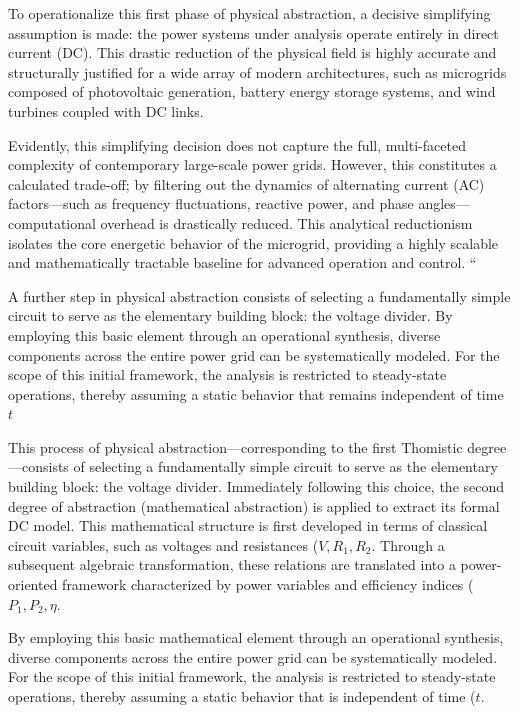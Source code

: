 \documentclass[energies,accept,oneauthor,pdftex]{Definitions/mdpi}
\begin{document}
To operationalize this first phase of physical abstraction, a decisive simplifying assumption is made: the power systems under analysis operate entirely in direct current (DC). This drastic reduction of the physical field is highly accurate and structurally justified for a wide array of modern architectures, such as microgrids composed of photovoltaic generation, battery energy storage systems, and wind turbines coupled with DC links.

Evidently, this simplifying decision does not capture the full, multi-faceted complexity of contemporary large-scale power grids. However, this constitutes a calculated trade-off; by filtering out the dynamics of alternating current (AC) factors—such as frequency fluctuations, reactive power, and phase angles—computational overhead is drastically reduced. This analytical reductionism isolates the core energetic behavior of the microgrid, providing a highly scalable and mathematically tractable baseline for advanced operation and control. ``

A further step in physical abstraction consists of selecting a fundamentally simple circuit to serve as the elementary building block: the voltage divider. By employing this basic element through an operational synthesis, diverse components across the entire power grid can be systematically modeled. For the scope of this initial framework, the analysis is restricted to steady-state operations, thereby assuming a static behavior that remains independent of time \(t\)


This process of physical abstraction—corresponding to the first Thomistic degree—consists of selecting a fundamentally simple circuit to serve as the elementary building block: the voltage divider. Immediately following this choice, the second degree of abstraction (mathematical abstraction) is applied to extract its formal DC model. This mathematical structure is first developed in terms of classical circuit variables, such as voltages and resistances (\(V, R_1, R_2\). Through a subsequent algebraic transformation, these relations are translated into a power-oriented framework characterized by power variables and efficiency indices (\(P_1, P_2, \eta\).


By employing this basic mathematical element through an operational synthesis, diverse components across the entire power grid can be systematically modeled. For the scope of this initial framework, the analysis is restricted to steady-state operations, thereby assuming a static behavior that is independent of time (\(t\).
\end{document}
